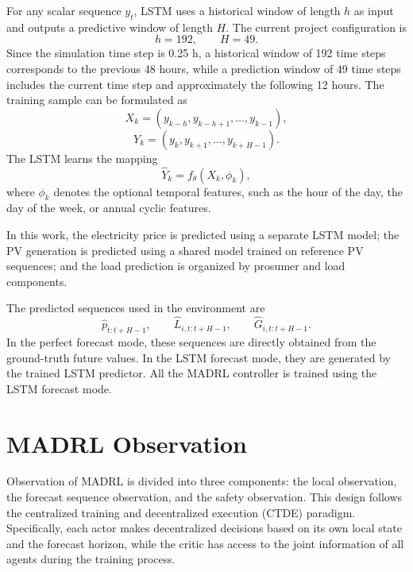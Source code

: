 For any scalar sequence \(y_t\), LSTM uses a historical window of length \(h\) as input and outputs a predictive window of length \(H\). The current project configuration is
\[
  h=192,\qquad H=49.
\]
Since the simulation time step is 0.25 h, a historical window of 192 time steps corresponds to the previous 48 hours, while a prediction window of 49 time steps includes the current time step and approximately the following 12 hours. The training sample can be formulated as
\[
  X_k=(y_{k-h},y_{k-h+1},\ldots,y_{k-1}),
\]
\[
  Y_k=(y_k,y_{k+1},\ldots,y_{k+H-1}).
\]
The LSTM learns the mapping
\[
  \hat{Y}_k=f_{\theta}(X_k,\phi_k),
\]
where \(\phi_k\) denotes the optional temporal features, such as the hour of the day, the day of the week, or annual cyclic features.

In this work, the electricity price is predicted using a separate LSTM model; the PV generation is predicted using a shared model trained on reference PV sequences; and the load prediction is organized by prosumer and load components.

The predicted sequences used in the environment are
\[
  \hat p_{t:t+H-1},\qquad
  \hat L_{i,t:t+H-1},\qquad
  \hat G_{i,t:t+H-1}.
\]
In the perfect forecast mode, these sequences are directly obtained from the ground-truth future values. In the LSTM forecast mode, they are generated by the trained LSTM predictor. All the MADRL controller is trained using the LSTM forecast mode.

\section{MADRL Observation}

Observation of MADRL is divided into three components: the local observation, the forecast sequence observation, and the safety observation. This design follows the centralized training and decentralized execution (CTDE) paradigm. Specifically, each actor makes decentralized decisions based on its own local state and the forecast horizon, while the critic has access to the joint information of all agents during the training process.

